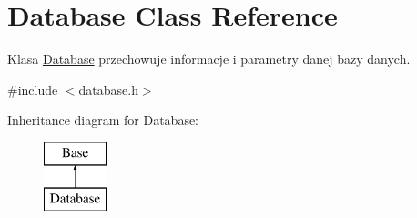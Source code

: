 \hypertarget{class_database}{}\section{Database Class Reference}
\label{class_database}


Klasa \mbox{\hyperlink{class_database}{Database}} przechowuje informacje i parametry danej bazy danych.  




{\ttfamily \#include $<$database.\+h$>$}

Inheritance diagram for Database\+:\begin{figure}[H]
\begin{center}
\leavevmode
\includegraphics[height=2.000000cm]{class_database}
\end{center}
\end{figure}
